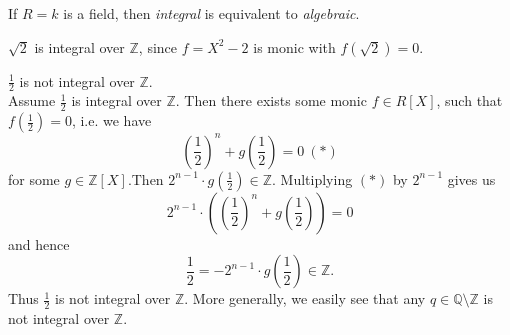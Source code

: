 \documentclass[11pt]{book}
\theoremstyle{nonumberbreak}
\newenvironment{ex}[1][]{\ifthenelse{\equal{#1}{}}{\example}{\example[#1]}\rm}{\endexample}
\begin{document}
\begin{spacing}{1.3}
\begin{ex}
\begin{compactenum}
\item If $R= k$ is a field, then \textit{integral} is equivalent to \textit{algebraic}.
\item $\sqrt{2}$ is integral over $\mathbb{Z}$, since $f=X^2-2$ is monic with $f(\sqrt{2})=0$.
\item $\frac{1}{2}$ is not integral over $\mathbb{Z}$.\\
Assume $\frac{1}{2}$ is integral over $\mathbb{Z}$. Then there exists some monic $f \in R[X]$, such that $f\left(\frac{1}{2}\right)=0$, i.e. we have
$$\left(\frac{1}{2}\right)^n+g\left(\frac{1}{2}\right) =0 \ (*)$$
for some $g \in \mathbb{Z}[X]$.Then $2^{n-1} \cdot g\left(\frac{1}{2}\right) \in \mathbb{Z}$. Multiplying $(*)$ by $2^{n-1}$ gives us
$$2^{n-1} \cdot \left(\left(\frac{1}{2}\right)^n+g\left(\frac{1}{2}\right)\right)=0$$
and hence
$$ \frac{1}{2}=-2^{n-1} \cdot g\left(\frac{1}{2}\right) \in \mathbb{Z}.$$
Thus $\frac{1}{2}$ is not integral over $\mathbb{Z}$. More generally, we easily see that any $q \in \mathbb{Q} \setminus \mathbb{Z}$ is not integral over $\mathbb{Z}$.
\end{compactenum}
\end{ex}




\end{spacing}
\end{document}
